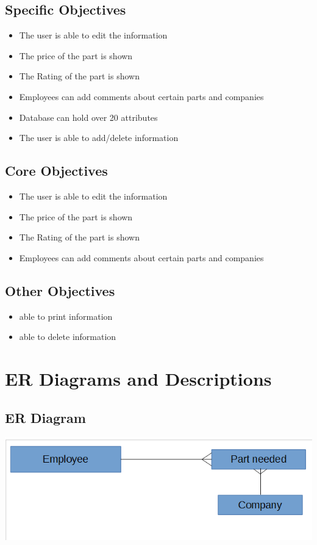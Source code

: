 \subsection{Specific Objectives}
\begin{itemize}
	\item The user is able to edit the information 
	\item The price of the part is shown
	\item The Rating of the part is shown
	\item Employees can add comments about certain parts and companies
	\item Database can hold over 20 attributes
	\item The user is able to add/delete information
\end{itemize}
\subsection{Core Objectives}
\begin{itemize}
	\item The user is able to edit the information 
	\item The price of the part is shown
	\item The Rating of the part is shown
	\item Employees can add comments about certain parts and companies
\end{itemize}
\subsection{Other Objectives}
\begin{itemize}
	\item able to print information
	\item able to delete information
\end{itemize}
\section{ER Diagrams and Descriptions}

\subsection{ER Diagram}
\begin{center}
\includegraphics[width =\textwidth]{ERDiagram.jpg}
\end{center}

